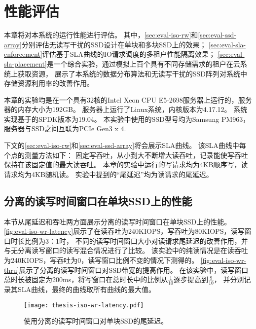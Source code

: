 
\chapter{性能评估}
\label{chap:eval}

本章将对本系统的运行性能进行评估。
其中，\autoref{sec:eval-iso-rw}和\autoref{sec:eval-ssd-array}分别评估无读写干扰的SSD设计在单块和多块SSD上的效果；
\autoref{sec:eval-sla-enforcement}评估基于SLA曲线的IO请求调度的多租户性能隔离效果；
\autoref{sec:eval-sla-placement}是一个综合实验，通过模拟上百个具有不同存储需求的租户在云系统上获取资源，
展示了本系统的数据分布算法和无读写干扰的SSD阵列对系统中存储资源利用率的改善作用。

本章的实验均是在一个具有32核的Intel Xeon CPU E5-2698服务器上运行的，服务器的内存大小为192GB。
服务器上运行了Linux系统，内核版本为4.17.12。
系统实现基于的SPDK版本为19.04。
本实验中使用的SSD型号均为Samsung PM963，服务器与SSD之间互联为PCIe Gen3 x 4.

下文的\autoref{sec:eval-iso-rw}和\autoref{sec:eval-ssd-array}将会展示SLA曲线。
该SLA曲线中每个点的测量方法如下：
固定写吞吐，从小到大不断增大读吞吐，记录能使写吞吐保持在该固定值的最大读吞吐。
本章的实验中运行的写请求均为4KB顺序写，读请求均为4KB随机读。
实验中提到的“尾延迟”均为读请求的尾延迟。

\section{分离的读写时间窗口在单块SSD上的性能}
\label{sec:eval-iso-rw}

本节从尾延迟和吞吐两方面展示分离的读写时间窗口在单块SSD上的性能。
\autoref{fig:eval-iso-wr-latency}展示了在读吞吐为240KIOPS，写吞吐为80KIOPS，读写窗口时长比例为3：1时，
不同的读写时间窗口大小对读请求尾延迟的改善作用，并与无分离读写窗口的读写混合情况进行了比较。
该实验中的纯读情况是在读吞吐为240KIOPS，写吞吐为0，读写窗口比例不变的情况下测得的。
\autoref{fig:eval-iso-wr-thru}展示了分离的读写时间窗口对SSD带宽的提高作用。
在该实验中，读写窗口总时长被固定为200ms，将写窗口在总时长中的比例从$\frac{1}{10}$逐步提高到$\frac{9}{10}$，
并分别记录其SLA曲线，最终的曲线取所有曲线的最大值。

\begin{figure}[h]
  \centering
  \texttt{[image: thesis-iso-wr-latency.pdf]}
  \caption{
        使用分离的读写时间窗口对单块SSD的尾延迟。
      }
  \label{fig:eval-iso-wr-latency}
\end{figure}

